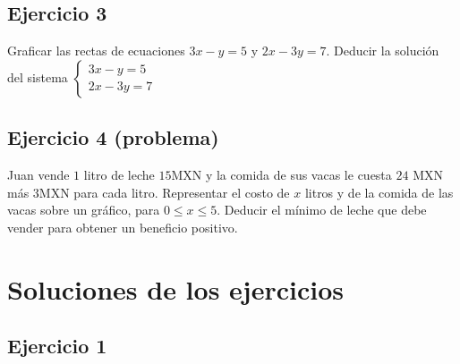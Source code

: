 \begin{center}
\end{center}

\subsection*{Ejercicio 3}

Graficar las rectas de ecuaciones $3x-y=5$ y $2x-3y=7$. Deducir la solución
del sistema $\left\{\begin{aligned}
   3x-y=5 \\
  2x-3y=7
\end{aligned}\right.$

\subsection*{Ejercicio 4 (problema)}

Juan vende $1$ litro de leche $15$MXN y la comida de sus vacas le cuesta
$24$ MXN más $3$MXN para cada litro.
Representar el costo de $x$ litros y de la comida de las
vacas sobre un gráfico, para $0 \leq x \leq 5$. Deducir el mínimo de leche
que debe vender para obtener un beneficio positivo.

\section{Soluciones de los ejercicios}

\subsection*{Ejercicio 1}

